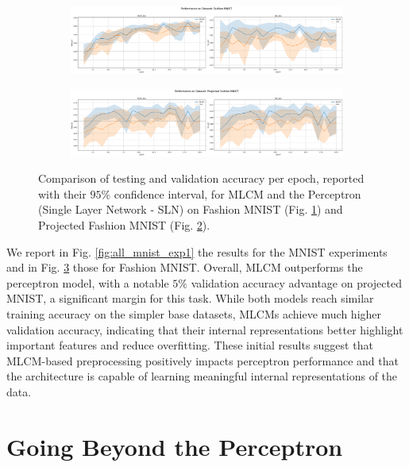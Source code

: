 \documentclass[a4paper,12pt]{report}
\begin{document}
\begin{figure}[h!]
    \centering
    \begin{subfigure}{\experimentlength\textwidth}
        \includegraphics[width=\linewidth]{pictures/fashion_mnist_exp1.png}
        \caption{}\label{fig:fashion_mnist_exp1}
    \end{subfigure}
    \hfill
    \begin{subfigure}{\experimentlength\textwidth}
        \includegraphics[width=\linewidth]{pictures/projected_fashion_mnist_exp1.png}
        \caption{}\label{fig:efashion_mnist_exp1}
    \end{subfigure}
    \caption{Comparison of testing and validation accuracy per epoch, reported with their 
    $95\%$ confidence interval, for MLCM and the Perceptron (Single Layer Network - 
    SLN) on Fashion MNIST (Fig. \ref{fig:fashion_mnist_exp1}) and Projected Fashion 
    MNIST (Fig. \ref{fig:efashion_mnist_exp1}).}
    \label{fig:all_fashion_mnist_exp1}
\end{figure}

We report in Fig. \ref{fig:all_mnist_exp1} the results for the MNIST experiments and 
in Fig. \ref{fig:all_fashion_mnist_exp1} those for Fashion MNIST. Overall, MLCM 
outperforms the perceptron model, with a notable $5\%$ validation accuracy advantage 
on projected MNIST, a significant margin for this task. While both models reach 
similar training accuracy on the simpler base datasets, MLCMs achieve much higher 
validation accuracy, indicating that their internal representations better highlight 
important features and reduce overfitting. These initial results suggest that 
MLCM-based preprocessing positively impacts perceptron performance and that the 
architecture is capable of learning meaningful internal representations of the data.
\section{Going Beyond the Perceptron}
\end{document}
